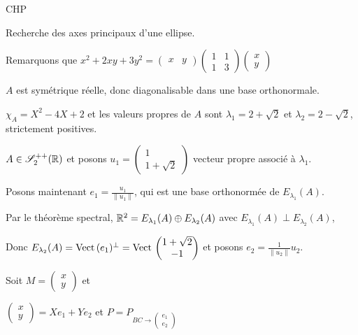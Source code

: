 \begin{exemple}
    CHP 

    Recherche des axes principaux d'une ellipse.

    Remarquons que $x^2 + 2xy + 3y^2 = \begin{pmatrix}
        x & y
    \end{pmatrix} \begin{pmatrix}
        1 & 1 \\
        1 & 3
    \end{pmatrix} \begin{pmatrix}
        x \\ y
    \end{pmatrix}$

    $A$ est symétrique réelle, donc diagonalisable dans une base orthonormale. 

    $\chi_A = X^2 - 4X + 2$ et les valeurs propres de $A$ sont $\lambda_1 = 2 + \sqrt 2$ et $\lambda_2 = 2 - \sqrt 2$, 
    strictement positives.

    $A \in \mathscr S_2^{++}(\mathbb{R})$ et posons $u_1 = \begin{pmatrix}
        1 \\ 1 + \sqrt 2
    \end{pmatrix}$ vecteur propre associé à $\lambda_1$. 

    Posons maintenant $e_1 = \frac{u_1}{\| u_1 \|}$, qui est une base orthonormée de
    $E_{\lambda_1}(A)$.

    Par le théorème spectral, $\mathbb{R}^2 = E_{\lambda_1}(A) \oplus E_{\lambda_2}(A)$ avec 
    $E_{\lambda_1}(A) \perp E_{\lambda_2}(A)$,

    Donc $E_{\lambda_2}(A) = \operatorname{Vect} \, (e_1)^\perp = \operatorname{Vect} \, \begin{pmatrix}
        1 + \sqrt 2 \\ -1
    \end{pmatrix}$ et posons $e_2 = \frac 1 {\| u_2 \|} u_2$.

    Soit $M = \begin{pmatrix}
        x \\ y
    \end{pmatrix}$ et 

    $\begin{pmatrix}
        x \\ y
    \end{pmatrix} = X e_1 + Y e_2$ et $P = P_{BC \to \begin{pmatrix}
        e_1 \\ e_2
    \end{pmatrix}}$


\end{exemple}
